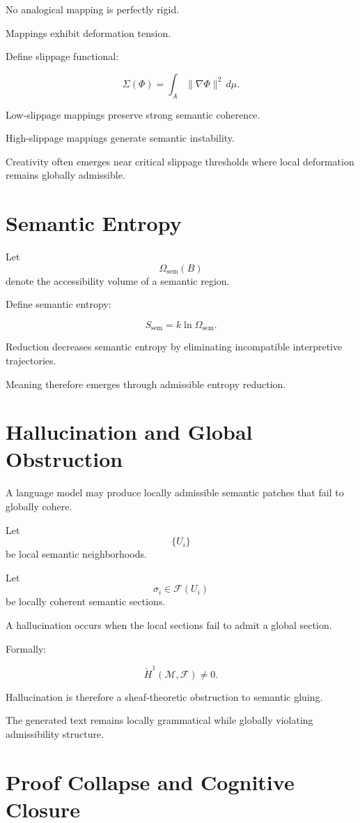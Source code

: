 \documentclass[12pt,openany]{book}
\theoremstyle{plain}
\theoremstyle{definition}
\theoremstyle{remark}
\begin{document}
No analogical mapping is perfectly rigid.

Mappings exhibit deformation tension.

Define slippage functional:

\[
\Sigma(\Phi)
=
\int_A
\|\nabla\Phi\|^2
\,d\mu.
\]

Low-slippage mappings preserve strong semantic coherence.

High-slippage mappings generate semantic instability.

Creativity often emerges near critical slippage thresholds where
local deformation remains globally admissible.

\section{Semantic Entropy}

Let
\[
\Omega_{\mathrm{sem}}(B)
\]
denote the accessibility volume of a semantic region.

Define semantic entropy:

\[
S_{\mathrm{sem}}
=
k\ln\Omega_{\mathrm{sem}}.
\]

Reduction decreases semantic entropy by eliminating incompatible
interpretive trajectories.

Meaning therefore emerges through admissible entropy reduction.

\section{Hallucination and Global Obstruction}

A language model may produce locally admissible semantic patches
that fail to globally cohere.

Let
\[
\{U_i\}
\]
be local semantic neighborhoods.

Let
\[
\sigma_i\in\mathcal{F}(U_i)
\]
be locally coherent semantic sections.

A hallucination occurs when the local sections fail to admit a
global section.

Formally:

\[
\check{H}^1(\mathcal{M},\mathcal{F})
\neq
0.
\]

Hallucination is therefore a sheaf-theoretic obstruction to
semantic gluing.

The generated text remains locally grammatical while globally
violating admissibility structure.

\section{Proof Collapse and Cognitive Closure}
\end{document}
